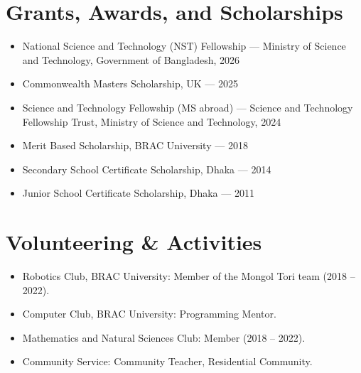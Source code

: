 \documentclass[a4paper,10pt]{article}
\begin{document}
\section{Grants, Awards, and Scholarships}
\begin{itemize}
  \item National Science and Technology (NST) Fellowship --- Ministry of Science and Technology, Government of Bangladesh, 2026
  \item Commonwealth Masters Scholarship, UK --- 2025
  \item Science and Technology Fellowship (MS abroad) --- Science and Technology Fellowship Trust, Ministry of Science and Technology, 2024
  \item Merit Based Scholarship, BRAC University --- 2018
  \item Secondary School Certificate Scholarship, Dhaka --- 2014
  \item Junior School Certificate Scholarship, Dhaka --- 2011
\end{itemize}

\section{Volunteering \& Activities}
\begin{itemize}
  \item Robotics Club, BRAC University: Member of the Mongol Tori team (2018 -- 2022).
  \item Computer Club, BRAC University: Programming Mentor.
  \item Mathematics and Natural Sciences Club: Member (2018 -- 2022).
  \item Community Service: Community Teacher, Residential Community.
\end{itemize}
\end{document}

